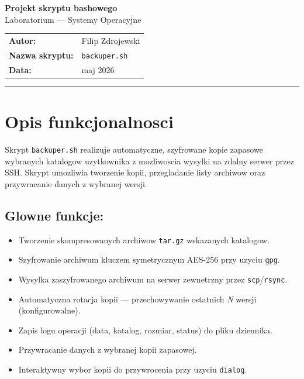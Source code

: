 \documentclass[a4paper,12pt]{article}
\begin{document}
\begin{center}
  {\LARGE\bfseries Projekt skryptu bashowego}\\[6pt]
  {\large Laboratorium --- Systemy Operacyjne}\\[12pt]
  \begin{tabular}{ll}
    \textbf{Autor:}         & Filip Zdrojewski \\
    \textbf{Nazwa skryptu:} & \texttt{backuper.sh} \\
    \textbf{Data:}          & maj 2026 \\
  \end{tabular}
\end{center}

\vspace{6pt}\hrule\vspace{8pt}

\section{Opis funkcjonalnosci}

Skrypt \texttt{backuper.sh} realizuje automatyczne, szyfrowane kopie zapasowe
wybranych katalogow uzytkownika z mozliwoscia wysylki na zdalny serwer przez SSH.
Skrypt umozliwia tworzenie kopii, przegladanie listy archiwow oraz przywracanie
danych z wybranej wersji.

\subsection*{Glowne funkcje:}
\begin{itemize}[leftmargin=1.5em, itemsep=1pt, topsep=2pt]
  \item Tworzenie skompresowanych archiwow \texttt{tar.gz} wskazanych katalogow.
  \item Szyfrowanie archiwum kluczem symetrycznym AES-256 przy uzyciu \texttt{gpg}.
  \item Wysylka zaszyfrowanego archiwum na serwer zewnetrzny przez \texttt{scp}/\texttt{rsync}.
  \item Automatyczna rotacja kopii --- przechowywanie ostatnich \textit{N} wersji (konfigurowalne).
  \item Zapis logu operacji (data, katalog, rozmiar, status) do pliku dziennika.
  \item Przywracanie danych z wybranej kopii zapasowej.
  \item Interaktywny wybor kopii do przywrocenia przy uzyciu \texttt{dialog}.
\end{itemize}
\end{document}
